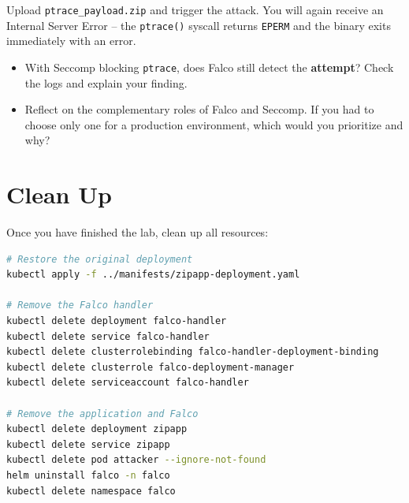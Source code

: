 Upload \texttt{ptrace\_payload.zip} and trigger the attack. You will again receive an Internal Server Error -- the \texttt{ptrace()} syscall returns \texttt{EPERM} and the binary exits immediately with an error.

\begin{tcolorbox}[colback=green!5!white,colframe=green!75!black,title=Question]
\begin{itemize}
    \item With Seccomp blocking \texttt{ptrace}, does Falco still detect the \textbf{attempt}? Check the logs and explain your finding.
    \item Reflect on the complementary roles of Falco and Seccomp. If you had to choose only one for a production environment, which would you prioritize and why?
\end{itemize}
\end{tcolorbox}

\section{Clean Up}

Once you have finished the lab, clean up all resources:

\begin{lstlisting}[language=bash]
# Restore the original deployment
kubectl apply -f ../manifests/zipapp-deployment.yaml

# Remove the Falco handler
kubectl delete deployment falco-handler
kubectl delete service falco-handler
kubectl delete clusterrolebinding falco-handler-deployment-binding
kubectl delete clusterrole falco-deployment-manager
kubectl delete serviceaccount falco-handler

# Remove the application and Falco
kubectl delete deployment zipapp
kubectl delete service zipapp
kubectl delete pod attacker --ignore-not-found
helm uninstall falco -n falco
kubectl delete namespace falco
\end{lstlisting}

